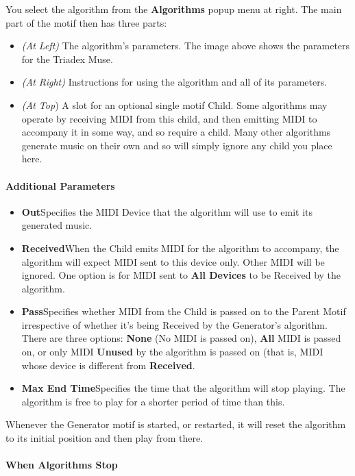 \documentclass[twoside,10pt]{article}
\begin{document}
\noindent You select the algorithm from the {\bf Algorithms} popup menu at right.  The main part of the motif then has three parts:

\begin{itemize}
\item {\it (At Left)} The algorithm's parameters.  The image above shows the parameters for the Triadex Muse.
\item {\it (At Right)} Instructions for using the algorithm and all of its parameters.
\item {\it (At Top}) A slot for an optional single motif Child.  Some algorithms may operate by receiving MIDI from this child, and then emitting MIDI to accompany it in some way, and so require a child.  Many other algorithms generate music on their own and so will simply ignore any child you place here. 
\end{itemize}

\paragraph{Additional Parameters}

\begin{itemize}
\item {\bf Out}\quad Specifies the MIDI Device that the algorithm will use to emit its generated music.
\item {\bf Received}\quad  When the Child emits MIDI for the algorithm to accompany, the algorithm will expect MIDI sent to this device only.  Other MIDI will be ignored.  One option is for MIDI sent to {\bf All Devices} to be Received by the algorithm.
\item {\bf Pass}\quad  Specifies whether MIDI from the Child is passed on to the Parent Motif irrespective of whether it's being Received by the Generator's algorithm.  There are three options:  {\bf None} (No MIDI is passed on), {\bf All} MIDI is passed on, or only MIDI {\bf Unused} by the algorithm is passed on (that is, MIDI whose device is different from {\bf Received}.
\item {\bf Max End Time}\quad Specifies the time that the algorithm will stop playing.  The algorithm is free to play for a shorter period of time than this.
\end{itemize}

Whenever the Generator motif is started, or restarted, it will reset the algorithm to its initial position and then play from there.

\paragraph{When Algorithms Stop}
\end{document}
